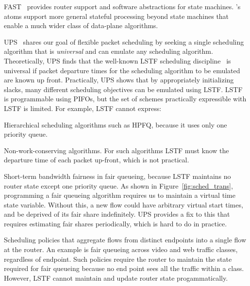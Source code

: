 FAST~\cite{fast} provides router support and software abstractions for
state machines. \absmachine's atoms support more general stateful processing
beyond state machines that enable a much wider class of data-plane algorithms.


 UPS~\cite{ups} shares our goal of
flexible packet scheduling by seeking a single scheduling algorithm that is
{\em universal} and can emulate any scheduling algorithm. Theoretically, UPS
finds that the well-known LSTF scheduling discipline~\cite{lstf} is universal
if packet departure times for the scheduling algorithm to be emulated are known
up front. Practically, UPS shows that by appropriately initializing slacks, many different scheduling objectives can be
emulated using LSTF. LSTF is programmable using PIFOs, but the set of schemes
practically expressible with LSTF is limited. For example, LSTF cannot
express:
\begin{CompactEnumerate}
\item Hierarchical scheduling algorithms such as HPFQ, because it
  uses only one priority queue.
\item Non-work-conserving algorithms. For such algorithms LSTF must know the
  departure time of each packet up-front, which is not practical.
\item Short-term bandwidth fairness in fair queueing, because LSTF maintains no
  router state except one priority queue. As shown in
  Figure~\ref{fig:sched_trans}, programming a fair queueing algorithm requires us
  to maintain a virtual time state variable. Without this, a new flow could have
  arbitrary virtual start times, and be deprived of its fair share indefinitely.
  UPS provides a fix to this that requires
  estimating fair shares periodically, which is hard to do in
  practice.
\item Scheduling policies that aggregate flows from distinct endpoints into a
  single flow at the router. An example is fair queueing across video and web
  traffic classes, regardless of endpoint.  Such policies require the router to
  maintain the state required for fair queueing because no end point sees all the
  traffic within a class.  However, LSTF cannot maintain and update router state
  progammatically.
\end{CompactEnumerate}


